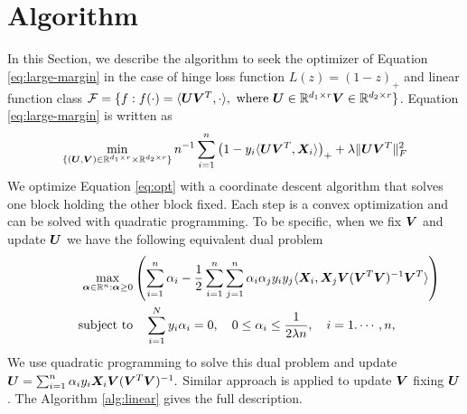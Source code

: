 \documentclass[12pt]{article}
\begin{document}
\section{Algorithm}
\label{sec:alg}
In this Section, we describe the algorithm to seek the optimizer of Equation  \eqref{eq:large-margin} in the case of hinge loss function $L(z) = (1-z)_+$ and linear function class $\mathcal{F} = \{f:f(\cdot)= \langle \bm{U}\bm{V}^T,\cdot\rangle, \text{ where }\bm{U}\in\mathbb{R}^{d_1\times r}\bm{V}\in\mathbb{R}^{d_2\times r}\}$.
Equation \eqref{eq:large-margin} is written as 
\begin{align}
\label{eq:opt}
\min_{\{(\bm{U},\bm{V})\in\mathbb{R}^{d_1\times r}\times \mathbb{R}^{d_2\times r}\}}n^{-1}\sum_{i=1}^n \left(1-y_i\langle \bm{U}\bm{V}^T,\bm X_i\rangle\right)_++\lambda \lVert\bm{U}\bm{V}^T\rVert_F^2
\end{align}
We optimize Equation \eqref{eq:opt} with a coordinate descent algorithm that solves one block holding the other block fixed.  Each step is a convex optimization and can be solved with quadratic programming.
To be specific, when we fix $\bm{V}$ and update $\bm{U}$ we have the following equivalent dual problem 
\begin{align}
 \hspace{1.5cm}\max_{\bm\alpha\in\mathbb{R}^n:\bm\alpha\geq0}& \left(\sum_{i=1}^n\alpha_i-\frac{1}{2}\sum_{i=1}^n\sum_{j=1}^n\alpha_i\alpha_jy_iy_j\langle \bm X_i,\bm X_j \bm{V}(\bm{V}^T\bm{V})^{-1}\bm{V}^T\rangle\right)\\
    \text{subject to}&\quad\sum_{i=1}^Ny_i\alpha_i = 0,\quad0\leq\alpha_i\leq\frac{1}{2\lambda n},\quad i=1.\cdots,n,
    \end{align}
   We use quadratic programming to solve this dual problem and update $\bm{U} = \sum_{i=1}^n\alpha_iy_i\bm X_i\bm{V}(\bm{V}^T\bm{V})^{-1}.$
Similar approach is applied to update $\bm{V}$ fixing $\bm{U}$.  The Algorithm \ref{alg:linear} gives the full description.
\end{document}
